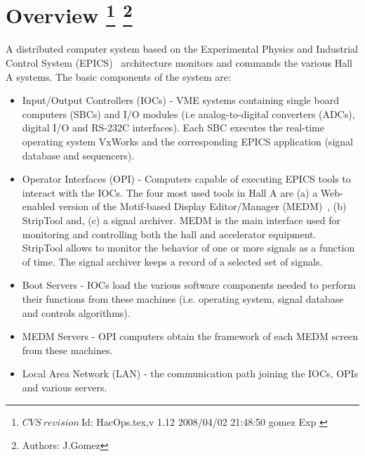 \chapter[Overview]{Overview
\footnote{
  $CVS~revision~ $Id: HacOps.tex,v 1.12 2008/04/02 21:48:50 gomez Exp $ $
}
\footnote{Authors: J.Gomez }
}
\label{chap:controls}

A distributed computer system
based on the 
Experimental Physics and Industrial Control System 
(EPICS)~\cite{EPICSwww}
 architecture monitors and commands
the various Hall A systems. The basic components of the system are:
\begin{itemize}
\item Input/Output Controllers (IOCs) - VME systems containing single
board computers (SBCs) and I/O modules
(i.e analog-to-digital converters (ADCs), digital I/O and RS-232C interfaces).
Each SBC executes the real-time operating system VxWorks and the corresponding EPICS application (signal database
and sequencers).
\item Operator Interfaces (OPI) - Computers capable of executing
EPICS tools to interact with the IOCs.
The four most used tools in Hall A are (a)
a Web-enabled version of the Motif-based Display Editor/Manager (MEDM)~\cite{MEDMwww}, 
(b) StripTool and, (c) a signal archiver.
MEDM is the main interface used for monitoring and controlling both the hall and accelerator
equipment. StripTool allows to monitor 
the behavior of one or more signals as a function of time. 
The signal archiver keeps a record of a selected set of signals.
\item Boot Servers - IOCs load the various
software components needed to perform their functions from these machines (i.e. operating system,
signal database and controls algorithms).
\item MEDM Servers - OPI computers obtain the framework of each MEDM screen from these machines.
\item Local Area Network (LAN) - the communication path joining the IOCs, OPIs and various servers.
\end{itemize}

